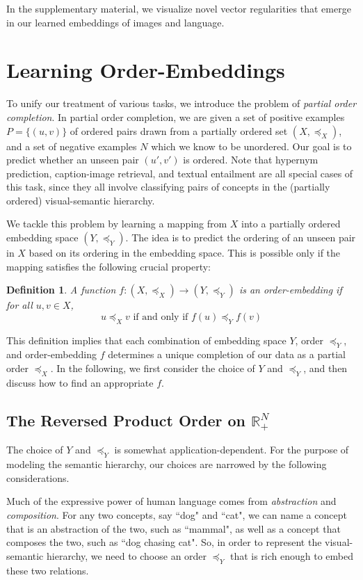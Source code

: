 \documentclass{article} \usepackage{iclr2016_conference,times}
\newtheorem{definition}{Definition}
\begin{document}
In the supplementary material, we visualize novel vector regularities that emerge in our learned embeddings of images and language.
 
\section{Learning Order-Embeddings}
\label{method}
To unify our treatment of various tasks, we introduce the problem of \emph{partial order completion}.
In partial order completion, we are given a set of positive examples $P = \{(u,v)\}$ of ordered pairs drawn from a partially ordered set  $(X, \preceq_X)$, and a set of negative examples $N$ which we know to be unordered. Our goal is to predict whether an unseen pair $(u', v')$ is ordered. Note that  hypernym prediction, caption-image retrieval, and textual entailment are all special cases of this task, since they all involve classifying pairs of concepts in the (partially ordered) visual-semantic hierarchy.





We tackle this problem by  learning a mapping from $X$ into a partially ordered embedding space $(Y, \preceq_Y)$. The idea is to predict the ordering of an unseen pair in $X$ based on its ordering in the embedding space.  This is possible only if the mapping satisfies the following crucial property:
\begin{definition}
\label{eq:order}
A function $f : (X, \preceq_X) \to (Y, \preceq_Y)$ is an order-embedding if for all $u,v \in X$,
$$ u \preceq_X v \text{  if and only if  } f(u) \preceq_Y f(v) \label{eq:order-embedding} $$
\end{definition}

This definition implies that each combination of embedding space $Y$, order $\preceq_Y$, and order-embedding $f$ determines a unique completion of our data as a partial order $\preceq_X$. In the following, we first consider the choice of $Y$ and $\preceq_Y$, and then discuss how to find an appropriate $f$.

\subsection{The Reversed Product Order on $\mathbb{R}_{+}^N$}
The choice of $Y$ and $\preceq_Y$ is somewhat application-dependent. For the purpose of modeling the semantic hierarchy, our choices are narrowed by the following considerations.

Much of the expressive power of human language comes from \emph{abstraction} and \emph{composition}. 
For any two concepts, say ``dog" and ``cat", we can name a concept that is an abstraction of the two, such as ``mammal", as well as a concept that composes the two, such as ``dog chasing cat". 
So, in order to represent the visual-semantic hierarchy, we need to choose an order $\preceq_Y$ that is rich enough to embed these two relations.
\end{document}
